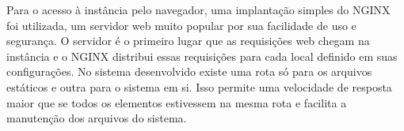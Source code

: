 \par Para o acesso à instância pelo navegador, uma implantação simples do NGINX \cite{NGINX} foi utilizada, um servidor web muito popular por sua facilidade de uso e segurança. O servidor é o primeiro lugar que as requisições web chegam na instância e o NGINX distribui essas requisições para cada local definido em suas configurações. No sistema desenvolvido existe uma rota só para os arquivos estáticos e outra para o sistema em si. Isso permite uma velocidade de resposta maior que se todos os elementos estivessem na mesma rota e facilita a manutenção dos arquivos do sistema.




